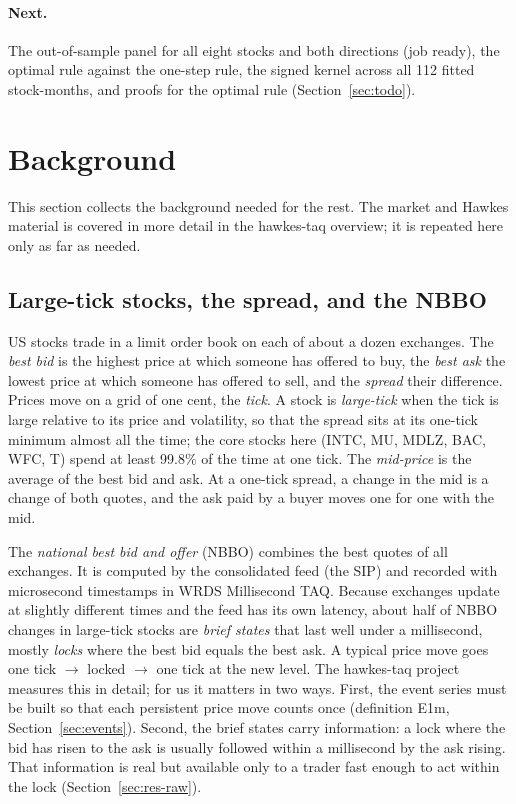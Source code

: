 \documentclass[11pt]{article}
\theoremstyle{definition}
\theoremstyle{remark}
\newcommand{\Em}{\textsf{E1m}}
\begin{document}
\paragraph{Next.} The out-of-sample panel for all eight stocks and both directions (job ready), the optimal rule against the one-step rule, the signed kernel across all 112 fitted stock-months, and proofs for the optimal rule (Section~\ref{sec:todo}).

\section{Background}
\label{sec:background}

This section collects the background needed for the rest. The market and Hawkes material is covered in more detail in the hawkes-taq overview; it is repeated here only as far as needed.

\subsection{Large-tick stocks, the spread, and the NBBO}
\label{sec:bg-market}

US stocks trade in a limit order book on each of about a dozen exchanges. The \emph{best bid} is the highest price at which someone has offered to buy, the \emph{best ask} the lowest price at which someone has offered to sell, and the \emph{spread} their difference. Prices move on a grid of one cent, the \emph{tick}. A stock is \emph{large-tick} when the tick is large relative to its price and volatility, so that the spread sits at its one-tick minimum almost all the time; the core stocks here (INTC, MU, MDLZ, BAC, WFC, T) spend at least 99.8\% of the time at one tick. The \emph{mid-price} is the average of the best bid and ask. At a one-tick spread, a change in the mid is a change of both quotes, and the ask paid by a buyer moves one for one with the mid.

The \emph{national best bid and offer} (NBBO) combines the best quotes of all exchanges. It is computed by the consolidated feed (the SIP) and recorded with microsecond timestamps in WRDS Millisecond TAQ. Because exchanges update at slightly different times and the feed has its own latency, about half of NBBO changes in large-tick stocks are \emph{brief states} that last well under a millisecond, mostly \emph{locks} where the best bid equals the best ask. A typical price move goes one tick $\to$ locked $\to$ one tick at the new level. The hawkes-taq project measures this in detail; for us it matters in two ways. First, the event series must be built so that each persistent price move counts once (definition \Em, Section~\ref{sec:events}). Second, the brief states carry information: a lock where the bid has risen to the ask is usually followed within a millisecond by the ask rising. That information is real but available only to a trader fast enough to act within the lock (Section~\ref{sec:res-raw}).
\end{document}
